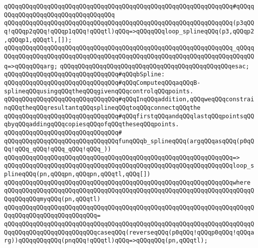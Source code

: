 \verb|qQQqqQQqqQQqqQQqqQQqqQQqqQQqqQQqqQQqqQQqqQQqqQQqqQQqqQQqqQQqqQQq#qQQqqQQqqQQqqQQqqQQqqQQqqQQqqQQqqQQq|\newline
\verb|qQQqqQQqqQQqqQQqqQQqqQQqqQQqqQQqqQQqqQQqqQQqqQQqqQQqqQQqqQQqqQQq(p3qQQq!qQQqp2qQQq!qQQqp1qQQq!qQQqtl)qQQq=>qQQqqQQqloop_splineqQQq(p3,qQQqp2,qQQqp1,qQQqtl,[]);|\newline
\verb|qQQqqQQqqQQqqQQqqQQqqQQqqQQqqQQqqQQqqQQqqQQqqQQqqQQqqQQqqQQqqQQq_qQQqqQQqqQQqqQQqqQQqqQQqqQQqqQQqqQQqqQQqqQQqqQQqqQQqqQQqqQQqqQQqqQQqqQQqqQQq=>qQQqqQQqarg;|\newline
\verb|qQQqqQQqqQQqqQQqqQQqqQQqqQQqqQQqqQQqqQQqqQQqqQQqesac;|\newline
\newline
\newline
\verb|qQQqqQQqqQQqqQQqqQQqqQQqqQQqqQQq#qQQqbSpline:|\newline
\verb|qQQqqQQqqQQqqQQqqQQqqQQqqQQqqQQq#qQQqComputeqQQqaqQQqB-splineqQQqusingqQQqtheqQQqgivenqQQqcontrolqQQqpoints.|\newline
\verb|qQQqqQQqqQQqqQQqqQQqqQQqqQQqqQQq#qQQqInqQQqaddition,qQQqweqQQqconstrainqQQqtheqQQqresultantqQQqsplineqQQqtoqQQqconnectqQQqthe|\newline
\verb|qQQqqQQqqQQqqQQqqQQqqQQqqQQqqQQq#qQQqfirstqQQqandqQQqlastqQQqpointsqQQqbyqQQqaddingqQQqcopiesqQQqofqQQqtheseqQQqpoints.|\newline
\verb|qQQqqQQqqQQqqQQqqQQqqQQqqQQqqQQq#|\newline
\verb|qQQqqQQqqQQqqQQqqQQqqQQqqQQqqQQqfunqQQqb_splineqQQq(argqQQqasqQQq(p0qQQq!qQQq_qQQq!qQQq_qQQq!qQQq_))|\newline
\verb|qQQqqQQqqQQqqQQqqQQqqQQqqQQqqQQqqQQqqQQqqQQqqQQqqQQqqQQqqQQqqQQq=>|\newline
\verb|qQQqqQQqqQQqqQQqqQQqqQQqqQQqqQQqqQQqqQQqqQQqqQQqqQQqqQQqqQQqqQQqloop_splineqQQq(pn,qQQqpn,qQQqpn,qQQqtl,qQQq[])|\newline
\verb|qQQqqQQqqQQqqQQqqQQqqQQqqQQqqQQqqQQqqQQqqQQqqQQqqQQqqQQqqQQqqQQqwhere|\newline
\verb|qQQqqQQqqQQqqQQqqQQqqQQqqQQqqQQqqQQqqQQqqQQqqQQqqQQqqQQqqQQqqQQqqQQqqQQqqQQqqQQqmyqQQq(pn,qQQqtl)|\newline
\verb|qQQqqQQqqQQqqQQqqQQqqQQqqQQqqQQqqQQqqQQqqQQqqQQqqQQqqQQqqQQqqQQqqQQqqQQqqQQqqQQqqQQqqQQqqQQqqQQq=|\newline
\verb|qQQqqQQqqQQqqQQqqQQqqQQqqQQqqQQqqQQqqQQqqQQqqQQqqQQqqQQqqQQqqQQqqQQqqQQqqQQqqQQqqQQqqQQqqQQqqQQqcaseqQQq(reverseqQQq(p0qQQq!qQQqp0qQQq!qQQqarg))qQQqqQQqqQQq(pnqQQq!qQQqtl)qQQq=>qQQqqQQq(pn,qQQqtl);|\newline
